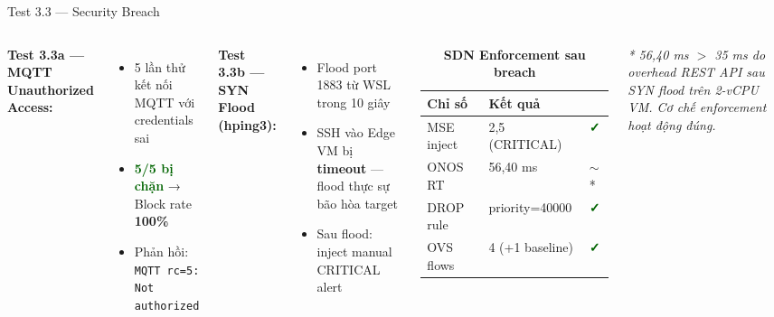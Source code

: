 \documentclass[aspectratio=169, 12pt]{beamer}
\newcommand{\cmark}{\textcolor{darkgreen}{\textbf{✓}}}
\begin{document}
\begin{frame}{Test 3.3 — Security Breach}

\begin{columns}[T]
\textbf{Test 3.3a — MQTT Unauthorized Access:}
\begin{itemize}
  \item 5 lần thử kết nối MQTT với credentials sai
  \item \textcolor{darkgreen}{\textbf{5/5 bị chặn}} → Block rate \textbf{100\%}
  \item Phản hồi: \texttt{MQTT rc=5: Not authorized}
\end{itemize}

\vspace{0.4cm}
\textbf{Test 3.3b — SYN Flood (hping3):}
\begin{itemize}
  \item Flood port 1883 từ WSL trong 10 giây
  \item SSH vào Edge VM bị \textbf{timeout} — flood thực sự bão hòa target
  \item Sau flood: inject manual CRITICAL alert
\end{itemize}

\begin{table}
\caption*{\textbf{SDN Enforcement sau breach}}
\renewcommand{\arraystretch}{1.3}
\begin{tabular}{lll}
\toprule
\textbf{Chỉ số} & \textbf{Kết quả} & \\
\midrule
MSE inject & 2,5 (CRITICAL) & \cmark \\
ONOS RT & 56,40 ms & $\sim$* \\
DROP rule & priority=40000 & \cmark \\
OVS flows & 4 (+1 baseline) & \cmark \\
\bottomrule
\end{tabular}
\end{table}

\begin{footnotesize}
\textit{* 56,40 ms $>$ 35 ms do overhead REST API sau SYN flood trên 2-vCPU VM. Cơ chế enforcement hoạt động đúng.}
\end{footnotesize}
\end{columns}

\end{frame}
\end{document}
